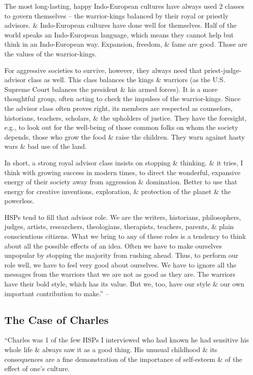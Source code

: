 \documentclass{article}
\numberwithin{equation}{section}
\begin{document}
The most long-lasting, happy Indo-European cultures have always used 2 classes to govern themselves -- the warrior-kings balanced by their royal or priestly advisors. \& Indo-European cultures have done well for themselves. Half of the world speaks an Indo-European language, which means they cannot help but think in an Indo-European way. Expansion, freedom, \& fame are good. Those are the values of the warrior-kings.

For aggressive societies to survive, however, they always need that priest-judge-advisor class as well. This class balances the kings \& warriors (as the U.S. Supreme Court balances the president \& his armed forces). It is a more thoughtful group, often acting to check the impulses of the warrior-kings. Since the advisor class often proves right, its members are respected as counselors, historians, teachers, scholars, \& the upholders of justice. They have the foresight, e.g., to look out for the well-being of those common folks on whom the society depends, those who grow the food \& raise the children. They warn against hasty wars \& bad use of the land.

In short, a strong royal advisor class insists on stopping \& thinking. \& it tries, I think with growing success in modern times, to direct the wonderful, expansive energy of their society away from aggression \& domination. Better to use that energy for creative inventions, exploration, \& protection of the planet \& the powerless.

HSPs tend to fill that advisor role. We are the writers, historians, philosophers, judges, artists, researchers, theologians, therapists, teachers, parents, \& plain conscientious citizens. What we bring to any of these roles is a tendency to think about all the possible effects of an idea. Often we have to make ourselves unpopular by stopping the majority from rushing ahead. Thus, to perform our role well, we have to feel very good about ourselves. We have to ignore all the messages from the warriors that we are not as good as they are. The warriors have their bold style, which has its value. But we, too, have our style \& our own important contribution to make.'' -- \cite[pp. 51--52]{Aron2013}

\subsection{The Case of Charles}
``Charles was 1 of the few HSPs I interviewed who had known he had sensitive his whole life \& always saw it as a good thing. His unusual childhood \& its consequences are a fine demonstration of the importance of self-esteem \& of the effect of one's culture.
\end{document}
